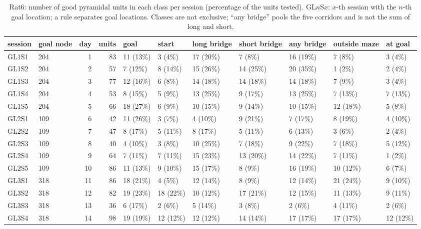 \begin{table}[htbp]
\centering
\scriptsize
\caption{Rat6: number of good pyramidal units in each class per session (percentage of the units tested). GL$n$S$x$: $x$-th session with the $n$-th goal location; a rule separates goal locations. Classes are not exclusive; ``any bridge'' pools the five corridors and is not the sum of long and short.}
\label{tab:cell_classes:Rat6}
\begin{tabular}{llrrlllllll}
\toprule
session & goal node & day & units & goal & start & long bridge & short bridge & any bridge & outside maze & at goal \\
\midrule
GL1S1 & 204 & 1 & 83 & 11 (13\%) & 3 (4\%) & 17 (20\%) & 7 (8\%) & 16 (19\%) & 7 (8\%) & 3 (4\%) \\
GL1S2 & 204 & 2 & 57 & 7 (12\%) & 8 (14\%) & 15 (26\%) & 14 (25\%) & 20 (35\%) & 1 (2\%) & 2 (4\%) \\
GL1S3 & 204 & 3 & 77 & 12 (16\%) & 6 (8\%) & 14 (18\%) & 14 (18\%) & 14 (18\%) & 7 (9\%) & 3 (4\%) \\
GL1S4 & 204 & 4 & 53 & 8 (15\%) & 5 (9\%) & 13 (25\%) & 9 (17\%) & 13 (25\%) & 7 (13\%) & 7 (13\%) \\
GL1S5 & 204 & 5 & 66 & 18 (27\%) & 6 (9\%) & 10 (15\%) & 9 (14\%) & 10 (15\%) & 12 (18\%) & 5 (8\%) \\
\midrule
GL2S1 & 109 & 6 & 42 & 11 (26\%) & 3 (7\%) & 4 (10\%) & 9 (21\%) & 7 (17\%) & 8 (19\%) & 4 (10\%) \\
GL2S2 & 109 & 7 & 47 & 8 (17\%) & 5 (11\%) & 8 (17\%) & 5 (11\%) & 6 (13\%) & 3 (6\%) & 2 (4\%) \\
GL2S3 & 109 & 8 & 40 & 4 (10\%) & 3 (8\%) & 10 (25\%) & 7 (18\%) & 9 (22\%) & 7 (18\%) & 5 (12\%) \\
GL2S4 & 109 & 9 & 64 & 7 (11\%) & 7 (11\%) & 15 (23\%) & 13 (20\%) & 14 (22\%) & 7 (11\%) & 1 (2\%) \\
GL2S5 & 109 & 10 & 86 & 11 (13\%) & 9 (10\%) & 15 (17\%) & 8 (9\%) & 16 (19\%) & 10 (12\%) & 6 (7\%) \\
\midrule
GL3S1 & 318 & 11 & 86 & 18 (21\%) & 4 (5\%) & 12 (14\%) & 8 (9\%) & 12 (14\%) & 21 (24\%) & 9 (10\%) \\
GL3S2 & 318 & 12 & 82 & 19 (23\%) & 18 (22\%) & 10 (12\%) & 17 (21\%) & 12 (15\%) & 11 (13\%) & 9 (11\%) \\
GL3S3 & 318 & 13 & 36 & 6 (17\%) & 2 (6\%) & 5 (14\%) & 3 (8\%) & 2 (6\%) & 4 (11\%) & 2 (6\%) \\
GL3S4 & 318 & 14 & 98 & 19 (19\%) & 12 (12\%) & 12 (12\%) & 14 (14\%) & 17 (17\%) & 17 (17\%) & 12 (12\%) \\

\end{tabular}
\end{table}
